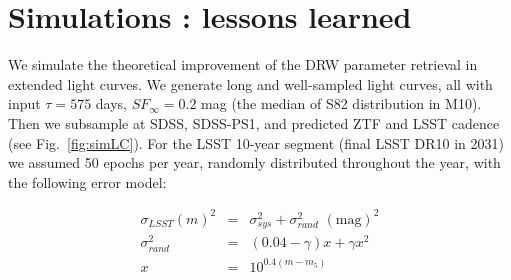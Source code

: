 \documentclass[twocolumn]{aastex62}
\begin{document}



%
%
%
%
%

\section{Simulations : lessons learned}\label{sec:simulation}

We simulate the theoretical improvement of the DRW parameter retrieval in extended light curves. We generate long and well-sampled light curves, all with input $\tau = 575 $ days, $SF_{\infty} = 0.2$ mag (the median of S82 distribution in M10). Then we subsample at SDSS, SDSS-PS1, and predicted ZTF and LSST cadence (see Fig.~\ref{fig:simLC}). For the LSST 10-year segment (final LSST DR10 in 2031) we assumed 50 epochs per year, randomly distributed throughout the year, with the following error model:

\begin{eqnarray}
\label{eq:errorModel}
\sigma_{LSST}(m)^{2} &=& \sigma_{sys}^{2} + \sigma_{rand}^{2} \,\, \mathrm{(mag)}^{2} \\
\sigma_{rand}^{2} &=& (0.04-\gamma)x + \gamma x^{2} \nonumber \\
x &=& 10^{0.4(m-m_{5})} \nonumber
\end{eqnarray}
\end{document}
